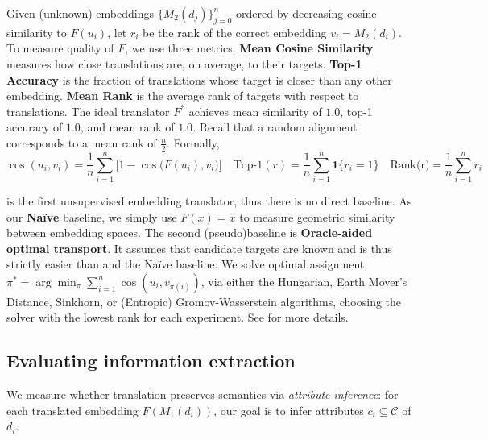 
Given (unknown) embeddings $\{M_2(d_j)\}_{j=0}^n$ ordered by decreasing cosine similarity to $F(u_i)$, let $r_i$ be the rank of the correct embedding $v_i=M_2(d_i)$.  To measure quality of $F$, we use three metrics. \textbf{Mean Cosine Similarity} measures how close translations are, on average, to their targets. \textbf{Top-1 Accuracy} is the fraction of translations whose target is closer than any other embedding. \textbf{Mean Rank} is the average
rank of targets with respect to translations. The ideal translator \(F^*\) achieves mean similarity of \(1.0\), top-1 accuracy of \(1.0\), and mean rank of \(1.0\). Recall that a random alignment corresponds to a mean rank of $\frac{n}{2}$. Formally,
\begin{equation*}
    \cos(u_i, v_i)= \frac{1}{n}\sum_{i=1}^{n}\bigl[1 - \cos\bigl(F(u_i), v_i\bigr)\bigr] \quad \text{Top-1}(r)=\frac{1}{n}\sum_{i=1}^{n}\mathbf{1}\{r_i = 1\}\quad \text{Rank(r)}=\frac{1}{n}\sum_{i=1}^{n} r_i
\end{equation*}

\atk{} is the first unsupervised embedding translator, thus there is no direct baseline. As our \textbf{Naïve} baseline, we simply use $F(x)=x$ to measure geometric similarity between embedding spaces.  The second (pseudo)baseline is \textbf{Oracle-aided optimal transport}.  It assumes that candidate targets are known and is thus strictly easier than \atk{} and the Naïve baseline.  We solve optimal assignment, $\pi^* = \arg\min_\pi \sum_{i=1}^n \cos(u_i, v_{\pi(i)})$, via either the Hungarian, Earth Mover’s Distance, Sinkhorn, or (Entropic) Gromov-Wasserstein algorithms, choosing the solver with the lowest rank for each experiment. See  for more details.


\subsection{Evaluating information extraction}\label{sec:extracting_attributes}

We measure whether translation preserves semantics via \textit{attribute inference}:
for each translated embedding $F(M_1(d_i))$, our goal is to infer attributes $c_i \subseteq \mathcal{C}$ of $d_i$.

